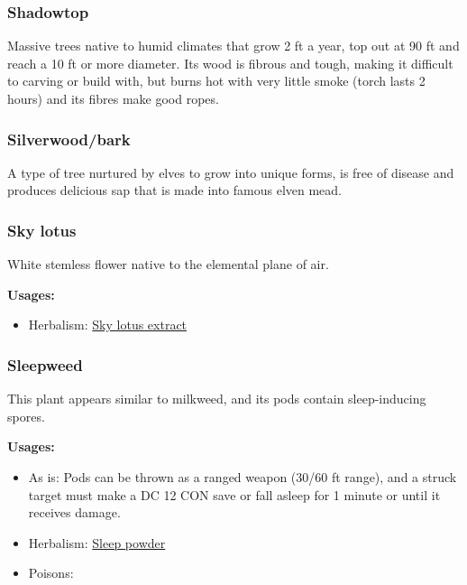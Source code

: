 \subsubsection{Shadowtop}

Massive trees native to humid climates that grow 2 ft a year, top out at 90 ft and reach a 10 ft or more diameter. Its wood is fibrous and tough, making it difficult to carving or build with, but burns hot with very little smoke (torch lasts 2 hours) and its fibres make good ropes.

\subsubsection{Silverwood/bark}

A type of tree nurtured by elves to grow into unique forms, is free of disease and produces delicious sap that is made into famous elven mead.

\subsubsection{Sky lotus}
\label{Sky lotus}

White stemless flower native to the elemental plane of air.

\vspace{5mm}

\textbf{Usages:}

\begin{itemize}[noitemsep]
\item[] Herbalism: \hyperref[Sky lotus extract]{Sky lotus extract}
\end{itemize}

\subsubsection{Sleepweed}
\label{Sleepweed}

This plant appears similar to milkweed, and its pods contain sleep-inducing spores.

\vspace{5mm}

\textbf{Usages:}

\begin{itemize}[noitemsep]
\item[] As is: Pods can be thrown as a ranged weapon (30/60 ft range), and a struck target must make a DC 12 CON save or fall asleep for 1 minute or until it receives damage.
\item[] Herbalism: \hyperref[Sleep powder]{Sleep powder}
\item[] Poisons: \poison
\end{itemize}

